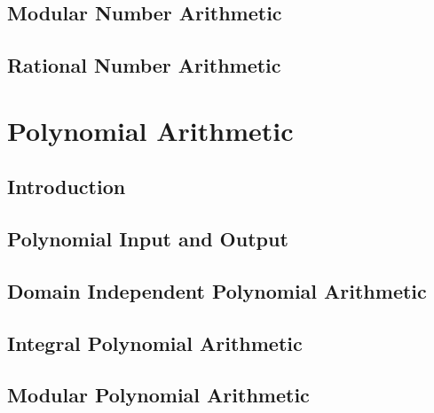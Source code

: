 \documentclass{report}
\begin{document}


\section{Modular Number Arithmetic}
\label{c:A s:MA}



\section{Rational Number Arithmetic}
\label{c:A s:RA}




\chapter{Polynomial Arithmetic}
\label{c:PA}

\section{Introduction}
\label{c:PA s:I}



\section{Polynomial Input and Output}
\label{cPAsPIO.tex}



\section{Domain Independent Polynomial Arithmetic}
\label{c:PA s:DIPA}



\section{Integral Polynomial Arithmetic}
\label{c:PA s:IPA}



\section{Modular Polynomial Arithmetic}
\label{c:PA s:MPA}
\end{document}
